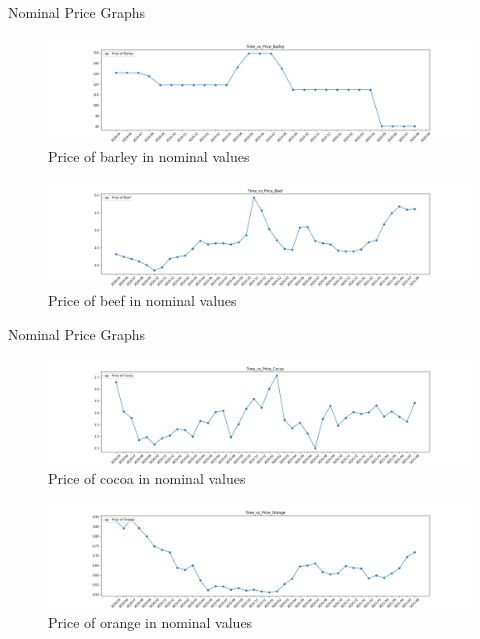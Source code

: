 \begin{frame}{Nominal Price Graphs}
\begin{figure} [H]
	\begin{center}
		\includegraphics[scale=0.2]{images/illustrate/Time_vs_Price_Barley.png}
	\end{center}
	\caption{Price of barley in nominal values}
	\label{fig:log-archi}
\end{figure}
\begin{figure} [H]
	\begin{center}
		\includegraphics[scale=0.2]{images/illustrate/Time_vs_Price_Beef.png}
	\end{center}
	\caption{Price of beef in nominal values}
	\label{fig:log-archi}
\end{figure}
    
\end{frame}
\begin{frame}{Nominal Price Graphs}
    \begin{figure} [H]
	\begin{center}
		\includegraphics[scale=0.2]{images/illustrate/Time_vs_Price_Cocoa.png}
	\end{center}
	\caption{Price of cocoa in nominal values}
	\label{fig:log-archi}
\end{figure}
\begin{figure} [H]
	\begin{center}
		\includegraphics[scale=0.2]{images/illustrate/Time_vs_Price_Orange.png}
	\end{center}
	\caption{Price of orange in nominal values}
	\label{fig:log-archi}
\end{figure}
\end{frame}

